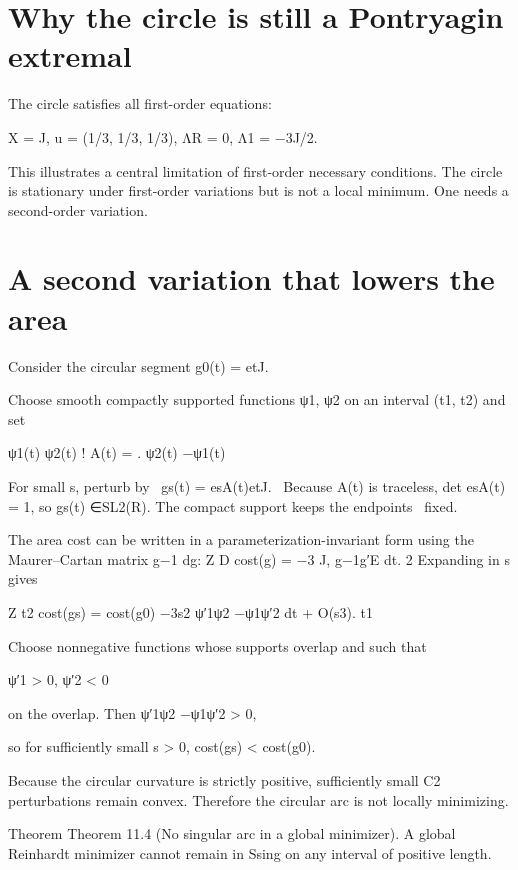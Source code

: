 \section{Why the circle is still a Pontryagin extremal}

The circle satisfies all first-order equations:


\begin{displaytext}
X = J, u = (1/3, 1/3, 1/3), ΛR = 0, Λ1 = −3J/2.
\end{displaytext}

This illustrates a central limitation of first-order necessary conditions. The circle is stationary under first-order variations but is not a local minimum. One needs a second-order variation.


\section{A second variation that lowers the area}

Consider the circular segment g0(t) = etJ.


Choose smooth compactly supported functions ψ1, ψ2 on an interval (t1, t2) and set


ψ1(t) ψ2(t) ! A(t) = . ψ2(t) −ψ1(t)


\begin{displaytext}
For small s, perturb by \
gs(t) = esA(t)etJ. \
Because A(t) is traceless, det esA(t) = 1, so gs(t) ∈SL2(R). The compact support keeps the endpoints \
fixed.
\end{displaytext}

The area cost can be written in a parameterization-invariant form using the Maurer–Cartan matrix g−1 dg: Z D cost(g) = −3 J, g−1g′E dt. 2 Expanding in s gives


Z t2 cost(gs) = cost(g0) −3s2 ψ′1ψ2 −ψ1ψ′2 dt + O(s3). t1


Choose nonnegative functions whose supports overlap and such that


ψ′1 > 0, ψ′2 < 0


on the overlap. Then ψ′1ψ2 −ψ1ψ′2 > 0,


so for sufficiently small s > 0, cost(gs) < cost(g0).


Because the circular curvature is strictly positive, sufficiently small C2 perturbations remain convex. Therefore the circular arc is not locally minimizing.


\begin{statementbox}{Theorem}
Theorem 11.4 (No singular arc in a global minimizer). A global Reinhardt minimizer cannot remain in Ssing on any interval of positive length.
\end{statementbox}

